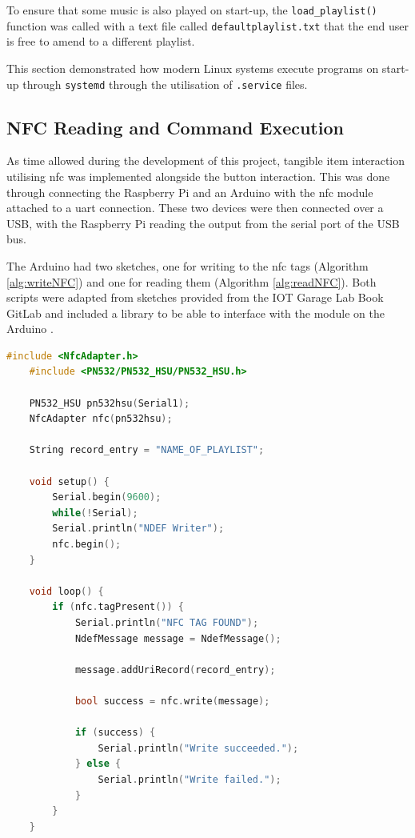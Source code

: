 To ensure that some music is also played on start-up, the \texttt{load\_playlist()} function was called with a text file called \texttt{defaultplaylist.txt} that the end user is free to amend to a different playlist.

This section demonstrated how modern Linux systems execute programs on start-up through \texttt{systemd} through the utilisation of \texttt{.service} files.
\subsection{NFC Reading and Command Execution}\label{subsec:NFC}
As time allowed during the development of this project, tangible item interaction utilising \gls{nfc} was implemented alongside the button interaction. This was done through connecting the Raspberry Pi and an Arduino with the \gls{nfc} module attached to a \gls{uart} connection. These two devices were then connected over a USB, with the Raspberry Pi reading the output from the serial port of the USB bus.

The Arduino had two sketches, one for writing to the \gls{nfc} tags (Algorithm \ref{alg:writeNFC}) and one for reading them (Algorithm \ref{alg:readNFC}). Both scripts were adapted from sketches provided from the IOT Garage Lab Book GitLab \citep{Perera2024} and included a library to be able to interface with the module on the Arduino \citep{SeeedStudios2020}.

\begin{algorithm}[H]
  \caption{writing\_nfc.ino - C++}
  \label{alg:writeNFC}
  \begin{lstlisting}[language=C++]
    #include <NfcAdapter.h>
    #include <PN532/PN532_HSU/PN532_HSU.h>

    PN532_HSU pn532hsu(Serial1);
    NfcAdapter nfc(pn532hsu);

    String record_entry = "NAME_OF_PLAYLIST";

    void setup() {
        Serial.begin(9600);
        while(!Serial);
        Serial.println("NDEF Writer");
        nfc.begin();
    }

    void loop() {
        if (nfc.tagPresent()) {
            Serial.println("NFC TAG FOUND");
            NdefMessage message = NdefMessage();

            message.addUriRecord(record_entry);

            bool success = nfc.write(message);
            
            if (success) {
                Serial.println("Write succeeded.");
            } else {
                Serial.println("Write failed.");
            }
        }
    }
  \end{lstlisting}
\end{algorithm}

